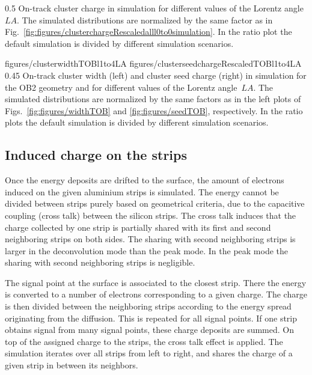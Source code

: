                  {0.5}       %
                 { On-track cluster charge in simulation for different values of the Lorentz angle~$LA$.   The simulated distributions are normalized by the same factor as in Fig.~\ref{fig:figures/clusterchargeRescaledalll0to0simulation}.  In the ratio plot the default simulation is divided by different simulation scenarios. }

                 {figures/clusterwidthTOBl1to4LA}
                 {figures/clusterseedchargeRescaledTOBl1to4LA} %
                 {0.45}       %
                 { On-track cluster width (left) and cluster seed charge (right) in simulation for the OB2 geometry and for different values of the Lorentz angle~$LA$.  The simulated distributions are normalized by the same factors as in the left plots of Figs.~\ref{fig:figures/widthTOB} and \ref{fig:figures/seedTOB}, respectively.   In the ratio plots the default simulation is divided by different simulation scenarios. }



\subsection{Induced charge on the strips~\label{sec:induce}}

Once the energy deposits are drifted to the surface, the amount of electrons induced on the given aluminium strips is simulated. The energy cannot be divided between strips purely based on geometrical criteria, due to the capacitive coupling (cross talk) between the silicon strips. The cross talk induces that the charge collected by one strip is partially shared with its first and second neighboring strips on both sides. The sharing with second neighboring strips is larger in the deconvolution mode than the peak mode. In the peak mode the sharing with second neighboring strips is negligible.   

The signal point at the surface is associated to the closest strip. There the energy is converted to a number of electrons corresponding to a given charge. The charge is then divided between the neighboring strips according to the energy spread originating from the diffusion. This is repeated for all signal points. If one strip obtains signal from many signal points, these charge deposits are summed. On top of the assigned charge to the strips, the cross talk effect is applied. The simulation iterates over all strips from left to right, and shares the charge of a given strip in between its neighbors.

